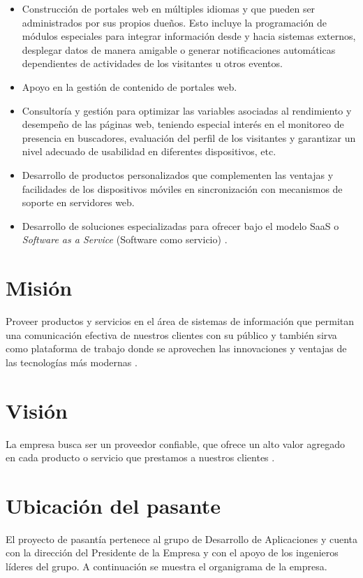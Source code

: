 \begin{itemize}
 \item Construcción de portales web en múltiples idiomas y que pueden ser administrados por sus propios dueños. Esto incluye la programación de módulos especiales para integrar información desde y hacia sistemas externos, desplegar datos de manera amigable o generar notificaciones automáticas dependientes de actividades de los visitantes u otros eventos.
 \item Apoyo en la gestión de contenido de portales web.
 \item Consultoría y gestión para optimizar las variables asociadas al rendimiento y desempeño de las páginas web, teniendo especial interés en el monitoreo de presencia en buscadores, evaluación del perfil de los visitantes y garantizar un nivel adecuado de usabilidad en diferentes dispositivos, etc.
 \item Desarrollo de productos personalizados que complementen las ventajas y facilidades de los dispositivos móviles en sincronización con mecanismos de soporte en servidores web.
 \item Desarrollo de soluciones especializadas para ofrecer bajo el modelo SaaS o \textit{Software as a Service} (Software como servicio) \cite{saas}.
\end{itemize}

\section{Misión}
Proveer productos y servicios en el área de sistemas de información que permitan una comunicación efectiva de nuestros clientes con su público y también sirva como plataforma de trabajo donde se aprovechen las innovaciones y ventajas de las tecnologías más modernas \cite{ikels}.

\section{Visión}
La empresa busca ser un proveedor confiable, que ofrece un alto valor agregado en cada producto o servicio que prestamos a nuestros clientes \cite{ikels}.

\section{Ubicación del pasante}
El proyecto de pasantía pertenece al grupo de Desarrollo de Aplicaciones y cuenta con la dirección del Presidente de la Empresa y con el apoyo de los ingenieros líderes del grupo. A continuación se muestra el organigrama de la empresa.


